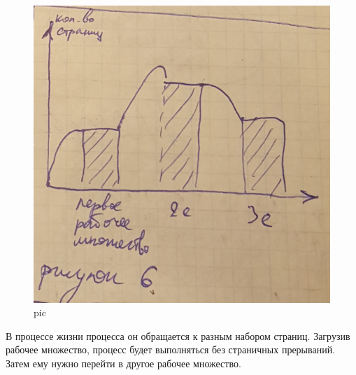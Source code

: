\begin{figure}[H]
    \centering
    \includegraphics[width=\textwidth]{pic/13.png}
    \caption{pic}
\end{figure}

В процессе жизни процесса он обращается к разным набором страниц. Загрузив рабочее множество, процесс будет выполняться без страничных прерываний. Затем ему нужно перейти в другое рабочее множество.  
